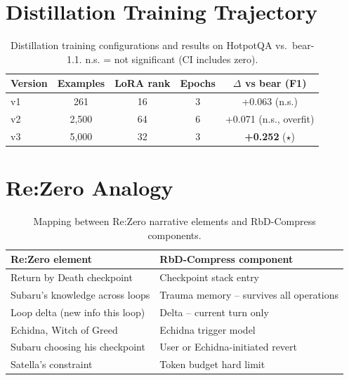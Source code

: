 \documentclass{article}
\begin{document}
\section{Distillation Training Trajectory}
\label{app:distillation}

\begin{table}[t]
\caption{Distillation training configurations and results on HotpotQA
vs.\ bear-1.1. n.s. = not significant (CI includes zero).}
\centering
\begin{tabular}{lcccc}
\toprule
Version & Examples & LoRA rank & Epochs & $\Delta$ vs bear (F1) \\
\midrule
v1 & 261   & 16 & 3 & +0.063 (n.s.) \\
v2 & 2,500 & 64 & 6 & +0.071 (n.s., overfit) \\
v3 & 5,000 & 32 & 3 & \textbf{+0.252} ($\star$) \\
\bottomrule
\end{tabular}
\end{table}


\section{Re:Zero Analogy}

\begin{table}[t]
\caption{Mapping between Re:Zero narrative elements and RbD-Compress
components.}
\centering
\begin{tabular}{ll}
\toprule
Re:Zero element & RbD-Compress component \\
\midrule
Return by Death checkpoint      & Checkpoint stack entry \\
Subaru's knowledge across loops & Trauma memory -- survives all operations \\
Loop delta (new info this loop) & Delta -- current turn only \\
Echidna, Witch of Greed         & Echidna trigger model \\
Subaru choosing his checkpoint  & User or Echidna-initiated revert \\
Satella's constraint            & Token budget hard limit \\
\bottomrule
\end{tabular}
\end{table}




\end{document}
